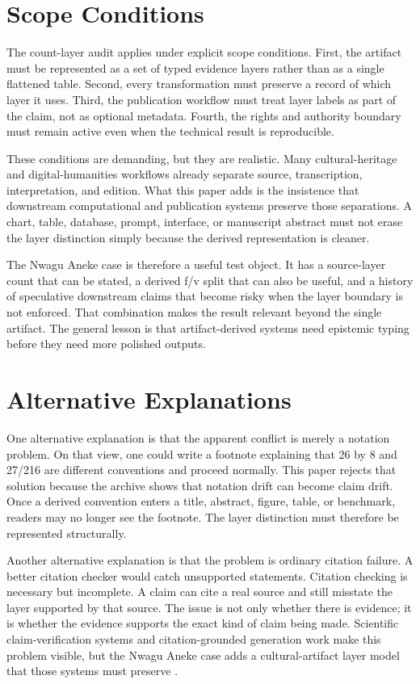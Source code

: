\documentclass[sigconf,nonacm]{acmart}
\begin{document}
\section{Scope Conditions}
The count-layer audit applies under explicit scope conditions. First, the artifact must be
represented as a set of typed evidence layers rather than as a single flattened
table. Second, every transformation must preserve a record of which layer it
uses. Third, the publication workflow must treat layer labels as part of the
claim, not as optional metadata. Fourth, the rights and authority boundary must
remain active even when the technical result is reproducible.

These conditions are demanding, but they are realistic. Many cultural-heritage
and digital-humanities workflows already separate source, transcription,
interpretation, and edition. What this paper adds is the insistence that
downstream computational and publication systems preserve those separations. A
chart, table, database, prompt, interface, or manuscript abstract must not erase
the layer distinction simply because the derived representation is cleaner.

The Nwagu Aneke case is therefore a useful test object. It has a source-layer
count that can be stated, a derived f/v split that can also be useful, and a
history of speculative downstream claims that become risky when the layer
boundary is not enforced. That combination makes the result relevant beyond the
single artifact. The general lesson is that artifact-derived systems need
epistemic typing before they need more polished outputs.

\section{Alternative Explanations}
One alternative explanation is that the apparent conflict is merely a notation
problem. On that view, one could write a footnote explaining that 26 by 8 and
27/216 are different conventions and proceed normally. This paper rejects that
solution because the archive shows that notation drift can become claim drift.
Once a derived convention enters a title, abstract, figure, table, or benchmark,
readers may no longer see the footnote. The layer distinction must therefore be
represented structurally.

Another alternative explanation is that the problem is ordinary citation
failure. A better citation checker would catch unsupported statements. Citation
checking is necessary but incomplete. A claim can cite a real source and still
misstate the layer supported by that source. The issue is not only whether there
is evidence; it is whether the evidence supports the exact kind of claim being
made. Scientific claim-verification systems and citation-grounded generation
work make this problem visible, but the Nwagu Aneke case adds a cultural-artifact
layer model that those systems must preserve \cite{wadden2020scifact,gao2023alce}.
\end{document}
